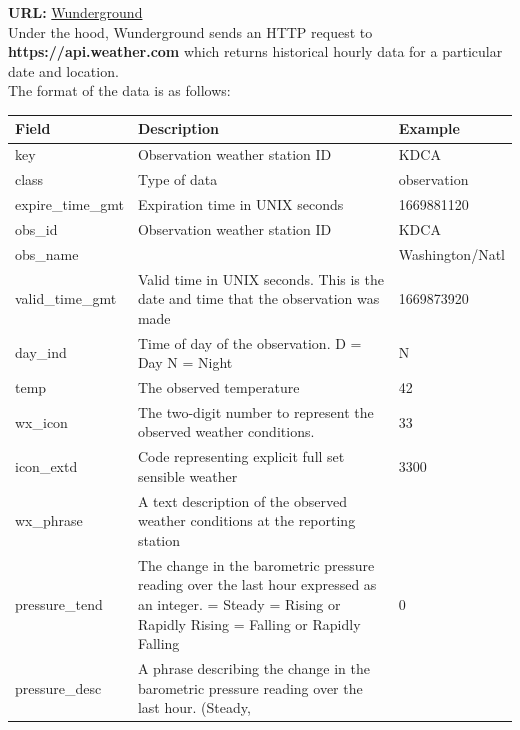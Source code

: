 \documentclass[paper=a4, fontsize=11pt, margin=1in]{scrartcl}
\numberwithin{equation}{section}		%
\numberwithin{figure}{section}			%
\numberwithin{table}{section}				%
\begin{document}
\textbf{URL:} \href{https://www.wunderground.com/history/daily/us/va/arlington/KDCA/date/2022-12-12}{Wunderground}\\

 Under the hood, Wunderground sends an HTTP request to \textbf{https://api.weather.com} which returns historical hourly data for a particular date and location. \\

 The format of the data is as follows:\\


\begin{longtable}{|p{4.5cm}|p{7cm} |p{3cm}|} %
\hline\hline %
\textbf{Field} & \textbf{Description} & \textbf{Example} \\  %
\hline
key & Observation weather station ID & KDCA \\
\hline
class & Type of data& observation \\
\hline
expire\_time\_gmt & Expiration time in UNIX seconds & 1669881120 \\
\hline
obs\_id & Observation weather station ID & KDCA \\
\hline
obs\_name & & Washington/Natl \\
\hline
valid\_time\_gmt & Valid time in UNIX seconds. This is the date and time that the observation was made & 1669873920 \\ 
\hline
day\_ind & Time of day of the observation. \newline D = Day \newline N = Night& N \\
\hline
temp & The observed temperature & 42 \\
\hline
wx\_icon & The two-digit number to represent the observed weather conditions. & 33 \\
\hline
icon\_extd & Code representing explicit full set sensible weather & 3300 \\
\hline
wx\_phrase & A text description of the observed weather conditions at the reporting station & \\
\hline
pressure\_tend & The change in the barometric pressure reading over the last hour expressed as an integer. \newline 0 = Steady \newline
1 = Rising or Rapidly Rising \newline
2 = Falling or Rapidly Falling & 0 \\
\hline
pressure\_desc & A phrase describing the change in the barometric pressure reading over the last hour. \newline (Steady, 

\end{longtable}
\end{document}
